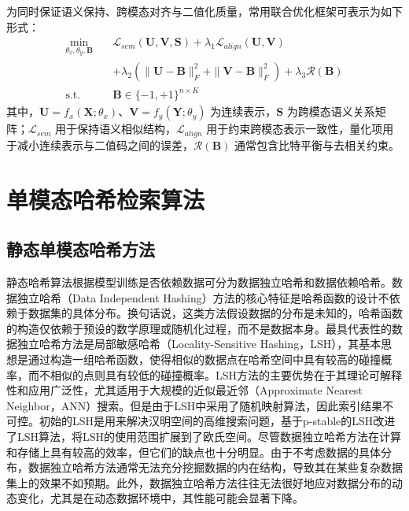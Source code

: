 为同时保证语义保持、跨模态对齐与二值化质量，常用联合优化框架可表示为如下形式：
\begin{equation}
  \begin{aligned}
    \min_{\theta_x,\theta_y,\mathbf{B}} \quad
    & \mathcal{L}_{sem}(\mathbf{U},\mathbf{V},\mathbf{S})
    +\lambda_1\mathcal{L}_{align}(\mathbf{U},\mathbf{V}) \\
    & +\lambda_2\!\left(\|\mathbf{U}-\mathbf{B}\|_F^2+\|\mathbf{V}-\mathbf{B}\|_F^2\right)
    +\lambda_3\mathcal{R}(\mathbf{B}) \\
    \text{s.t.} \quad
    & \mathbf{B}\in\{-1,+1\}^{n\times K}
  \end{aligned}
\end{equation}
其中，$\mathbf{U}=f_x(\mathbf{X};\theta_x)$、$\mathbf{V}=f_y(\mathbf{Y};\theta_y)$ 为连续表示，$\mathbf{S}$ 为跨模态语义关系矩阵；$\mathcal{L}_{sem}$ 用于保持语义相似结构，$\mathcal{L}_{align}$ 用于约束跨模态表示一致性，量化项用于减小连续表示与二值码之间的误差，$\mathcal{R}(\mathbf{B})$ 通常包含比特平衡与去相关约束。

\section{单模态哈希检索算法}

\subsection{静态单模态哈希方法}
静态哈希算法根据模型训练是否依赖数据可分为数据独立哈希和数据依赖哈希。数据独立哈希（Data Independent Hashing）方法的核心特征是哈希函数的设计不依赖于数据集的具体分布。换句话说，这类方法假设数据的分布是未知的，哈希函数的构造仅依赖于预设的数学原理或随机化过程，而不是数据本身。最具代表性的数据独立哈希方法是局部敏感哈希（Locality-Sensitive Hashing，LSH），其基本思想是通过构造一组哈希函数，使得相似的数据点在哈希空间中具有较高的碰撞概率，而不相似的点则具有较低的碰撞概率。LSH方法的主要优势在于其理论可解释性和应用广泛性，尤其适用于大规模的近似最近邻（Approximate Nearest Neighbor，ANN）搜索。但是由于LSH中采用了随机映射算法，因此索引结果不可控。初始的LSH是用来解决汉明空间的高维搜索问题，基于p-stable的LSH改进了LSH算法，将LSH的使用范围扩展到了欧氏空间。尽管数据独立哈希方法在计算和存储上具有较高的效率，但它们的缺点也十分明显。由于不考虑数据的具体分布，数据独立哈希方法通常无法充分挖掘数据的内在结构，导致其在某些复杂数据集上的效果不如预期。此外，数据独立哈希方法往往无法很好地应对数据分布的动态变化，尤其是在动态数据环境中，其性能可能会显著下降。

